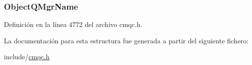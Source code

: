 \subsubsection[{Object\+Q\+Mgr\+Name}]{ Object\+Q\+Mgr\+Name}\label{structtag_m_q_o_r_ac72719d0cdc669269aa503462d5c7536}


Definición en la línea 4772 del archivo cmqc.\+h.



La documentación para esta estructura fue generada a partir del siguiente fichero\+:\begin{DoxyCompactItemize}
\item 
include/\hyperlink{cmqc_8h}{cmqc.\+h}\end{DoxyCompactItemize}

